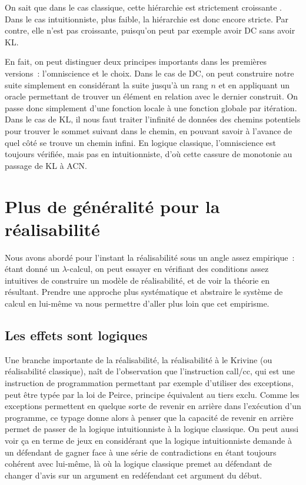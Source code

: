\documentclass{article}
\begin{document}
On sait que dans le cas classique, cette hiérarchie est strictement croissante . Dans le cas intuitionniste, plus faible, la hiérarchie est donc encore stricte. Par contre, elle n'est pas croissante, puisqu'on peut par exemple avoir DC sans avoir KL.

En fait, on peut distinguer deux principes importants dans les premières versions~: l'omniscience et le choix. Dans le cas de DC, on peut construire notre suite simplement en considérant la suite jusqu'à un rang $n$ et en appliquant un oracle permettant de trouver un élément en relation avec le dernier construit. On passe donc simplement d'une fonction locale à une fonction globale par itération. Dans le cas de KL, il nous faut traiter l'infinité de données des chemins potentiels pour trouver le sommet suivant dans le chemin, en pouvant savoir à l'avance de quel côté se trouve un chemin infini. En logique classique, l'omniscience est toujours vérifiée, mais pas en intuitionniste, d'où cette cassure de monotonie au passage de KL à ACN.

\section{Plus de généralité pour la réalisabilité}

Nous avons abordé pour l'instant la réalisabilité sous un angle assez empirique~: étant donné un $\lambda$-calcul, on peut essayer en vérifiant des conditions assez intuitives de construire un modèle de réalisabilité, et de voir la théorie en résultant. Prendre une approche plus systématique et abstraire le système de calcul en lui-même va nous permettre d'aller plus loin que cet empirisme.

\subsection{Les effets sont logiques}

Une branche importante de la réalisabilité, la réalisabilité à le Krivine (ou réalisabilité classique), naît de l'observation que l'instruction call/cc, qui est une instruction de programmation permettant par exemple d'utiliser des exceptions, peut être typée par la loi de Peirce, principe équivalent au tiers exclu. Comme les exceptions permettent en quelque sorte de revenir en arrière dans l'exécution d'un programme, ce typage donne alors à penser que la capacité de revenir en arrière permet de passer de la logique intuitionniste à la logique classique. On peut aussi voir ça en terme de jeux en considérant que la logique intuitionniste demande à un défendant de gagner face à une série de contradictions en étant toujours cohérent avec lui-même, là où la logique classique premet au défendant de changer d'avis sur un argument en redéfendant cet argument du début.
\end{document}
